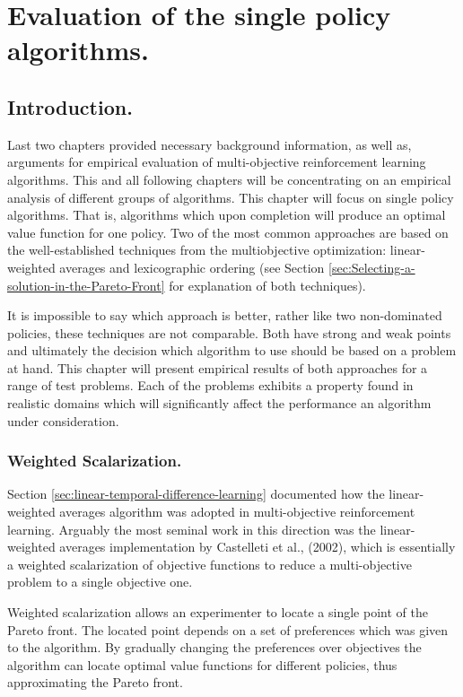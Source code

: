\chapter{Evaluation of the single policy algorithms.}

\section{Introduction.}
Last two chapters provided necessary background information, as well as, arguments for empirical evaluation of multi-objective reinforcement learning algorithms. This and all following chapters will be concentrating on an empirical analysis of different groups of algorithms. This chapter will focus on single policy algorithms. That is, algorithms which upon completion will produce an optimal value function for one policy. Two of the most common approaches are based on the well-established techniques from the multiobjective optimization: linear-weighted averages and lexicographic ordering (see Section \ref{sec:Selecting-a-solution-in-the-Pareto-Front} for explanation of both techniques).

It is impossible to say which approach is better, rather like two non-dominated policies, these techniques are not comparable. Both have strong and weak points and ultimately the decision which algorithm to use should be based on a problem at hand. This chapter will present empirical results of both approaches for a range of test problems. Each of the problems exhibits a property found in realistic domains which will significantly affect the performance an algorithm under consideration.

\subsection{Weighted Scalarization.}
Section \ref{sec:linear-temporal-difference-learning} documented how the linear-weighted averages algorithm was adopted in multi-objective reinforcement learning. Arguably the most seminal work in this direction was the linear-weighted averages implementation by Castelleti et al., (2002\nocite{castelletti2002reinforcement}), which is essentially a weighted scalarization of objective functions to reduce a multi-objective problem to a single objective one. 

Weighted scalarization allows an experimenter to locate a single point of the Pareto front. The located point depends on a set of preferences which was given to the algorithm. By gradually changing the preferences over objectives the algorithm can locate optimal value functions for different policies, thus approximating the Pareto front.

